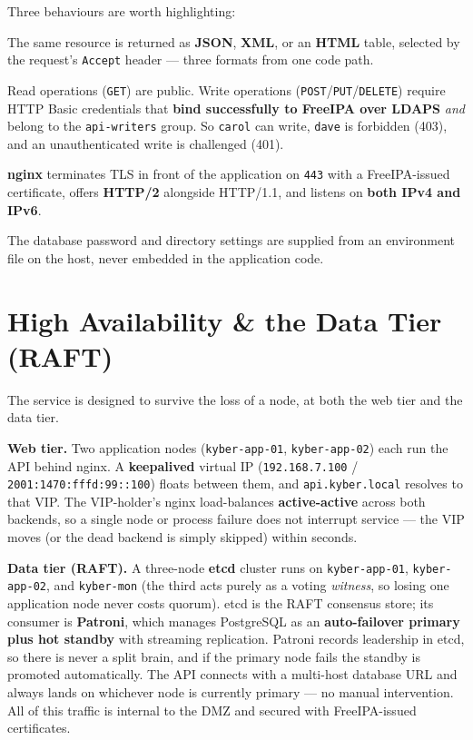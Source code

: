 \documentclass[11pt,a4paper]{article}
\newcommand{\code}[1]{\texttt{#1}}
\begin{document}
Three behaviours are worth highlighting:

\begin{description}[leftmargin=1.4em,style=nextline]
  \item[Content negotiation] The same resource is returned as \textbf{JSON}, \textbf{XML},
    or an \textbf{HTML} table, selected by the request's \code{Accept} header --- three
    formats from one code path.
  \item[Authentication \& authorisation] Read operations (\code{GET}) are public. Write
    operations (\code{POST}/\code{PUT}/\code{DELETE}) require HTTP Basic credentials that
    \textbf{bind successfully to FreeIPA over LDAPS} \emph{and} belong to the
    \code{api-writers} group. So \code{carol} can write, \code{dave} is forbidden (403),
    and an unauthenticated write is challenged (401).
  \item[Transport] \textbf{nginx} terminates TLS in front of the application on
    \code{443} with a FreeIPA-issued certificate, offers \textbf{HTTP/2} alongside
    HTTP/1.1, and listens on \textbf{both IPv4 and IPv6}.
\end{description}

The database password and directory settings are supplied from an environment file on the
host, never embedded in the application code.

\section{High Availability \& the Data Tier (RAFT)}
\label{sec:ha}

The service is designed to survive the loss of a node, at both the web tier and the data
tier.

\textbf{Web tier.} Two application nodes (\code{kyber-app-01}, \code{kyber-app-02}) each run
the API behind nginx. A \textbf{keepalived} virtual IP (\code{192.168.7.100} /
\code{2001:1470:fffd:99::100}) floats between them, and \code{api.kyber.local} resolves to
that VIP. The VIP-holder's nginx load-balances \textbf{active-active} across both backends,
so a single node or process failure does not interrupt service --- the VIP moves (or the
dead backend is simply skipped) within seconds.

\textbf{Data tier (RAFT).} A three-node \textbf{etcd} cluster runs on \code{kyber-app-01},
\code{kyber-app-02}, and \code{kyber-mon} (the third acts purely as a voting
\emph{witness}, so losing one application node never costs quorum). etcd is the RAFT
consensus store; its consumer is \textbf{Patroni}, which manages PostgreSQL as an
\textbf{auto-failover primary plus hot standby} with streaming replication. Patroni records
leadership in etcd, so there is never a split brain, and if the primary node fails the
standby is promoted automatically. The API connects with a multi-host database URL and
always lands on whichever node is currently primary --- no manual intervention. All of this traffic is
internal to the DMZ and secured with FreeIPA-issued certificates.
\end{document}
